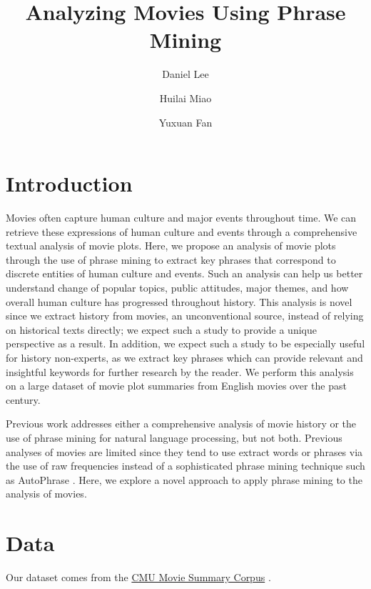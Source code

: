 \documentclass[hidelinks]{article}
\title{Analyzing Movies Using Phrase Mining}
\author{Daniel Lee \and Huilai Miao \and Yuxuan Fan}
\begin{document}
\maketitle

\begin{abstract}
\end{abstract}

\begin{multicols}{2}
\section{Introduction}
Movies often capture human culture and major events throughout time. We can retrieve these expressions of human culture and events through a comprehensive textual analysis of movie plots. Here, we propose an analysis of movie plots through the use of phrase mining to extract key phrases that correspond to discrete entities of human culture and events. Such an analysis can help us better understand change of popular topics, public attitudes, major themes, and how overall human culture has progressed throughout history. This analysis is novel since we extract history from movies, an unconventional source, instead of relying on historical texts directly; we expect such a study to provide a unique perspective as a result. In addition, we expect such a study to be especially useful for history non-experts, as we extract key phrases which can provide relevant and insightful keywords for further research by the reader. We perform this analysis on a large dataset of movie plot summaries from English movies over the past century.

Previous work addresses either a comprehensive analysis of movie history or the use of phrase mining for natural language processing, but not both. Previous analyses of movies are limited since they tend to use extract words or phrases via the use of raw frequencies instead of a sophisticated phrase mining technique such as AutoPhrase \cite{DBLP:journals/corr/ShangLJRVH17}. Here, we explore a novel approach to apply phrase mining to the analysis of movies.

\section{Data}
Our dataset comes from the \href{http://www.cs.cmu.edu/~ark/personas/}{CMU Movie Summary Corpus} \cite{Bamman2013LearningLP}.
\end{multicols}
\end{document}
